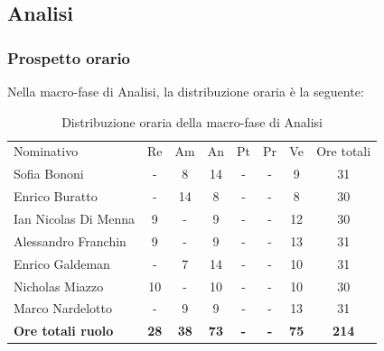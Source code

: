 \documentclass[../piano-di-progetto.tex]{subfiles}
\begin{document}
  \subsection{Analisi}

  \subsubsection{Prospetto orario}
  Nella macro-fase di Analisi, la distribuzione oraria è la seguente:
  \begin{table}[H]
    \centering
    \begin{tabular}{lccccccc}
      Nominativo                & Re         & Am         & An         & Pt         & Pr         & Ve         & Ore totali \\
      Sofia Bononi              & -          & 8          & 14          & -          & -          & 9          & 31          \\
      Enrico Buratto            & -          & 14         & 8          & -          & -          & 8          & 30          \\
      Ian Nicolas Di Menna      & 9          & -          & 9          & -          & -          & 12          & 30          \\
      Alessandro Franchin       & 9          & -          & 9          & -          & -          & 13          & 31         \\
      Enrico Galdeman           & -          & 7          & 14          & -          & -          & 10          & 31          \\
      Nicholas Miazzo           & 10         & -          & 10          & -          & -          & 10         & 30         \\
      Marco Nardelotto          & -          & 9          & 9         & -          & -          & 13          & 31          \\
      \textbf{Ore totali ruolo} & \textbf{28} & \textbf{38} & \textbf{73} & \textbf{-} & \textbf{-} & \textbf{75} & \textbf{214}
    \end{tabular}
    \caption{Distribuzione oraria della macro-fase di Analisi}
  \end{table}
\end{document}

